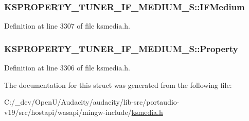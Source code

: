 \subsubsection[{\texorpdfstring{I\+F\+Medium}{IFMedium}}]{ K\+S\+P\+R\+O\+P\+E\+R\+T\+Y\+\_\+\+T\+U\+N\+E\+R\+\_\+\+I\+F\+\_\+\+M\+E\+D\+I\+U\+M\+\_\+\+S\+::\+I\+F\+Medium}\hypertarget{struct_k_s_p_r_o_p_e_r_t_y___t_u_n_e_r___i_f___m_e_d_i_u_m___s_ae9abba34bcbc18be48c64c51cd7f0d16}{}\label{struct_k_s_p_r_o_p_e_r_t_y___t_u_n_e_r___i_f___m_e_d_i_u_m___s_ae9abba34bcbc18be48c64c51cd7f0d16}


Definition at line 3307 of file ksmedia.\+h.

\subsubsection[{\texorpdfstring{Property}{Property}}]{ K\+S\+P\+R\+O\+P\+E\+R\+T\+Y\+\_\+\+T\+U\+N\+E\+R\+\_\+\+I\+F\+\_\+\+M\+E\+D\+I\+U\+M\+\_\+\+S\+::\+Property}\hypertarget{struct_k_s_p_r_o_p_e_r_t_y___t_u_n_e_r___i_f___m_e_d_i_u_m___s_a926e97ba6be227310a8b23513703f9a4}{}\label{struct_k_s_p_r_o_p_e_r_t_y___t_u_n_e_r___i_f___m_e_d_i_u_m___s_a926e97ba6be227310a8b23513703f9a4}


Definition at line 3306 of file ksmedia.\+h.



The documentation for this struct was generated from the following file\+:\begin{DoxyCompactItemize}
\item 
C\+:/\+\_\+dev/\+Open\+U/\+Audacity/audacity/lib-\/src/portaudio-\/v19/src/hostapi/wasapi/mingw-\/include/\hyperlink{ksmedia_8h}{ksmedia.\+h}\end{DoxyCompactItemize}
